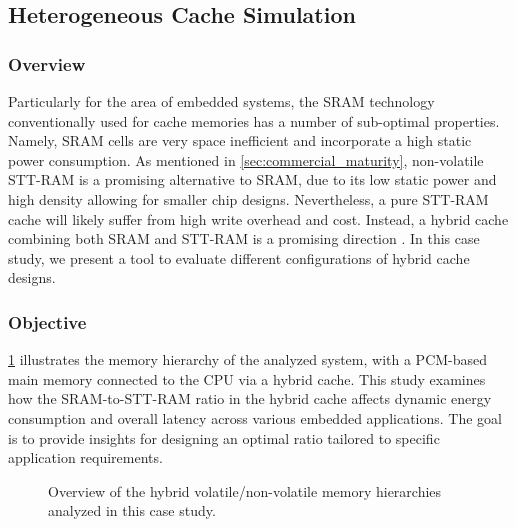 
\subsection{Heterogeneous Cache Simulation} \label{sec:nvm-cache}

\subsubsection{Overview}


 
  
   
    
    
    


Particularly for the area of embedded systems, the SRAM technology conventionally used for cache memories has a number of sub-optimal properties.
Namely, SRAM cells are very space inefficient and incorporate a high static power consumption.
As mentioned in \cref{sec:commercial_maturity}, non-volatile STT-RAM is a promising alternative to SRAM, due to its low static power and high density allowing for smaller chip designs.
Nevertheless, a pure STT-RAM cache will likely suffer from high write overhead and cost.
Instead, a hybrid cache combining both SRAM and STT-RAM is a promising direction \cite{4798259,5090762,7479181,9399236}.  In this case study, we present a tool to evaluate different configurations of hybrid cache designs.









\subsubsection{Objective}
\cref{fig:FAU-archOverview} illustrates the memory hierarchy of the analyzed system, with a PCM-based main memory connected to the CPU via a hybrid cache.
This study examines how the SRAM-to-STT-RAM ratio in the hybrid cache affects dynamic energy consumption and overall latency across various embedded applications.
The goal is to provide insights for designing an optimal ratio tailored to specific application requirements.

\begin{figure}[h]
    
    \caption{Overview of the hybrid volatile/non-volatile memory hierarchies analyzed in this case study.}
    \label{fig:FAU-archOverview}
\end{figure}

